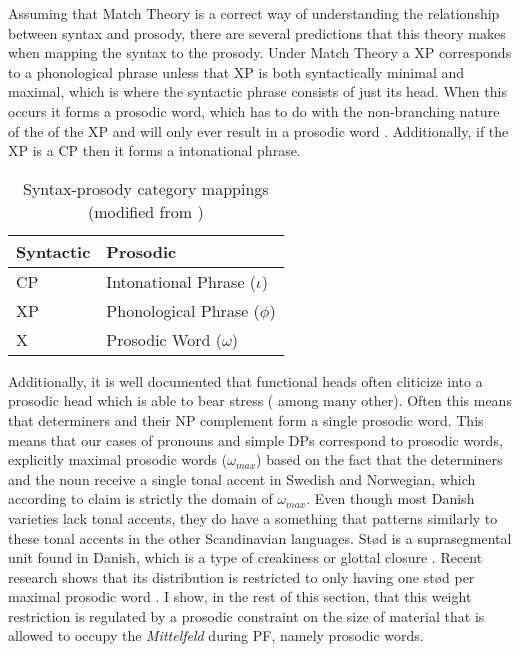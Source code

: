 \documentclass[12pt, letterpaper]{article}
\begin{document}
Assuming that Match Theory \citep{selkirkClauseIntonationalPhrase2009,selkirkSyntaxPhonologyInterface2011} is a correct way of understanding the relationship between syntax and prosody, there are several predictions that this theory makes when mapping the syntax to the prosody. Under Match Theory a XP corresponds to a phonological phrase unless that XP is both syntactically minimal and maximal, which is where the syntactic phrase consists of just its head. When this occurs it forms a prosodic word, which has to do with the non-branching nature of the of the XP and will only ever result in a prosodic word  \citep{bennettLightestRightApparently2016}. Additionally, if the XP is a CP then it forms a intonational phrase.
\begin{table}[!h]
\caption{Syntax-prosody category mappings (modified from \cite{tylerSimplifyingMATCHWORD2019})}
\label{tab:Mappings}
\centering
\begin{tabular}{ll}
\hline
\textbf{Syntactic}&\textbf{Prosodic}\\
\hline
CP & Intonational Phrase ($\iota$)\\
XP & Phonological Phrase ($\phi$) \\
X & Prosodic Word ($\omega$)\\
\hline
\end{tabular}
\end{table}  

Additionally, it is well documented that functional heads often cliticize into a prosodic head which is able to bear stress (\cite{zwickyClitics1977,selkirkProsodicStructureIts1981,zwickyCliticizationVsInflection1983,inkelasProsodicConstituencyLexicon1990} among many other). Often this means that determiners and their NP complement form a single prosodic word. This means that our cases of pronouns and simple DPs correspond to prosodic words, explicitly maximal prosodic words ($\omega_{max}$) based on the fact that the determiners and the noun receive a single tonal accent in Swedish and Norwegian, which according to  claim is strictly the domain of $\omega_{max}$. Even though most Danish varieties lack tonal accents, they do have a something that patterns similarly to these tonal accents in the other Scandinavian languages. Stød is a suprasegmental unit found in Danish, which is a type of creakiness or glottal closure \citep{basbollPhonologyDanish2005}. Recent research shows that its distribution is restricted to only having one stød per maximal prosodic word \citep{kalivodaProsodicRecursionPseudocyclicity2018}. I show, in the rest of this section, that this weight restriction is regulated by a prosodic constraint on the size of material that is allowed to occupy the \emph{Mittelfeld} during PF, namely prosodic words. 
\end{document}
